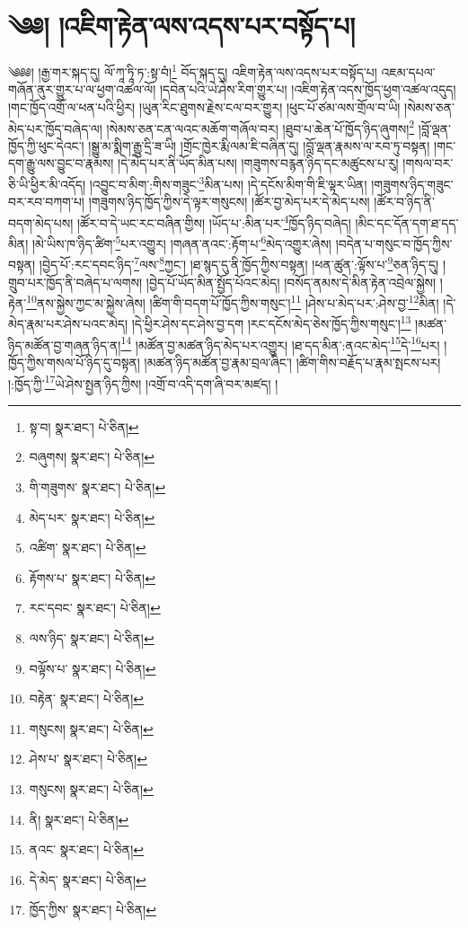 \setcounter{footnote}{0} 
\chapter{༄༅། །འཇིག་རྟེན་ལས་འདས་པར་བསྟོད་པ།}༄༅༅། །རྒྱ་གར་སྐད་དུ། ལོ་ཀཱ་ཏཱི་ཏ་:སྟ་བཾ།\footnote{སྟ་བ།  སྣར་ཐང་།  པེ་ཅིན། } བོད་སྐད་དུ། འཇིག་རྟེན་ལས་འདས་པར་བསྟོད་པ། འཇམ་དཔལ་གཞོན་ནུར་གྱུར་པ་ལ་ཕྱག་འཚལ་ལོ། །དབེན་པའི་ཡེ་ཤེས་རིག་གྱུར་པ། །འཇིག་རྟེན་འདས་ཁྱོད་ཕྱག་འཚལ་འདུད། །གང་ཁྱོད་འགྲོ་ལ་ཕན་པའི་ཕྱིར། །ཡུན་རིང་ཐུགས་རྗེས་ངལ་བར་གྱུར། །ཕུང་པོ་ཙམ་ལས་གྲོལ་བ་ཡི། །སེམས་ཅན་མེད་པར་ཁྱོད་བཞེད་ལ། །སེམས་ཅན་ངན་ལའང་མཆོག་གཞོལ་བར། །ཐུབ་པ་ཆེན་པོ་ཁྱོད་ཉིད་ཞུགས།\footnote{བཞུགས།  སྣར་ཐང་།  པེ་ཅིན། } །བློ་ལྡན་ཁྱོད་ཀྱི་ཕུང་དེའང་། །སྒྱུ་མ་སྨིག་རྒྱུ་དྲི་ཟ་ཡི། །གྲོང་ཁྱེར་རྨི་ལམ་ཇི་བཞིན་དུ། །བློ་ལྡན་རྣམས་ལ་རབ་ཏུ་བསྟན། །གང་དག་རྒྱུ་ལས་བྱུང་བ་རྣམས། །དེ་མེད་པར་ནི་ཡོད་མིན་པས། །གཟུགས་བརྙན་ཉིད་དང་མཚུངས་པ་རུ། །གསལ་བར་ཅི་ཡི་ཕྱིར་མི་འདོད། །འབྱུང་བ་མིག་:གིས་གཟུང་\footnote{གི་གཟུགས་  སྣར་ཐང་།  པེ་ཅིན། }མིན་པས། །དེ་དངོས་མིག་གི་ཇི་ལྟར་ཡིན། །གཟུགས་ཉིད་གཟུང་བར་རབ་བཀག་པ། །གཟུགས་ཉིད་ཁྱོད་ཀྱིས་དེ་ལྟར་གསུངས། །ཚོར་བྱ་མེད་པར་དེ་མེད་པས། །ཚོར་བ་ཉིད་ནི་བདག་མེད་པས། །ཚོར་བ་དེ་ཡང་རང་བཞིན་གྱིས། །ཡོད་པ་:མིན་པར་\footnote{མེད་པར་  སྣར་ཐང་།  པེ་ཅིན། }ཁྱོད་ཉིད་བཞེད། །མིང་དང་དོན་དག་ཐ་དད་མིན། །མེ་ཡིས་ཁ་ཉིད་ཚིག་\footnote{འཚིག་  སྣར་ཐང་།  པེ་ཅིན། }པར་འགྱུར། །གཞན་ནའང་:རྟོག་པ་\footnote{རྟོགས་པ་  སྣར་ཐང་།  པེ་ཅིན། }མེད་འགྱུར་ཞེས། །བདེན་པ་གསུང་བ་ཁྱོད་ཀྱིས་བསྟན། །བྱེད་པོ་:རང་དབང་ཉིད་\footnote{རང་དབང་  སྣར་ཐང་།  པེ་ཅིན། }ལས་\footnote{ལས་ཉིད་  སྣར་ཐང་།  པེ་ཅིན། }ཀྱང་། །ཐ་སྙད་དུ་ནི་ཁྱོད་ཀྱིས་བསྟན། །ཕན་ཚུན་:ལྟོས་པ་\footnote{བལྟོས་པ་  སྣར་ཐང་།  པེ་ཅིན། }ཅན་ཉིད་དུ། །གྲུབ་པར་ཁྱོད་ནི་བཞེད་པ་ལགས། །བྱེད་པོ་ཡོད་མིན་སྤྱོད་པོའང་མེད། །བསོད་ནམས་དེ་མིན་རྟེན་འབྲེལ་སྐྱེས། །རྟེན་\footnote{བརྟེན་  སྣར་ཐང་།  པེ་ཅིན། }ནས་སྐྱེས་ཀྱང་མ་སྐྱེས་ཞེས། །ཚིག་གི་བདག་པོ་ཁྱོད་ཀྱིས་གསུང་།\footnote{གསུངས།  སྣར་ཐང་།  པེ་ཅིན། } །ཤེས་པ་མེད་པར་:ཤེས་བྱ་\footnote{ཤེས་པ་  སྣར་ཐང་།  པེ་ཅིན། }མིན། །དེ་མེད་རྣམ་པར་ཤེས་པའང་མེད། །དེ་ཕྱིར་ཤེས་དང་ཤེས་བྱ་དག །རང་དངོས་མེད་ཅེས་ཁྱོད་ཀྱིས་གསུང་།\footnote{གསུངས།  སྣར་ཐང་།  པེ་ཅིན། } །མཚན་ཉིད་མཚོན་བྱ་གཞན་ཉིད་ན།\footnote{ནི།  སྣར་ཐང་།  པེ་ཅིན། } །མཚོན་བྱ་མཚན་ཉིད་མེད་པར་འགྱུར། །ཐ་དད་མིན་:ནའང་མེད་\footnote{ནའང་  སྣར་ཐང་།  པེ་ཅིན། }དེ་\footnote{དེ་མེད་  སྣར་ཐང་།  པེ་ཅིན། }པར། །ཁྱོད་ཀྱིས་གསལ་པོ་ཉིད་དུ་བསྟན། །མཚན་ཉིད་མཚོན་བྱ་རྣམ་བྲལ་ཞིང་། །ཚིག་གིས་བརྗོད་པ་རྣམ་སྤངས་པར། །:ཁྱོད་ཀྱི་\footnote{ཁྱོད་ཀྱིས་  སྣར་ཐང་།  པེ་ཅིན། }ཡེ་ཤེས་སྤྱན་ཉིད་ཀྱིས། །འགྲོ་བ་འདི་དག་ཞི་བར་མཛད། །
